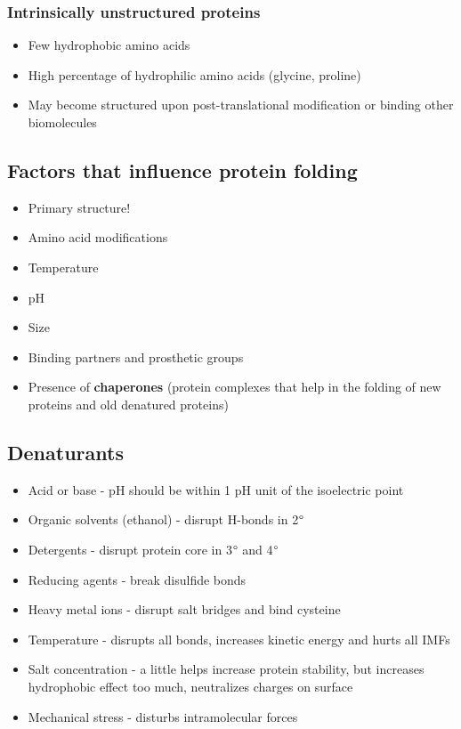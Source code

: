 \documentclass[letterpaper, 12pt]{article}
\begin{document}
\subsubsection*{Intrinsically unstructured proteins}

\begin{itemize}
\item Few hydrophobic amino acids
\item High percentage of hydrophilic amino acids (glycine, proline)
\item May become structured upon post-translational modification or binding other biomolecules
\end{itemize}

\subsection*{Factors that influence protein folding}

\begin{itemize}
\item Primary structure!
\item Amino acid modifications
\item Temperature
\item pH
\item Size
\item Binding partners and prosthetic groups
\item Presence of \textbf{chaperones} (protein complexes that help in the folding of new proteins and old denatured proteins)
\end{itemize}

\subsection*{Denaturants}

\begin{itemize}
\item Acid or base - pH should be within 1 pH unit of the isoelectric point
\item Organic solvents (ethanol) - disrupt H-bonds in 2$\degree$
\item Detergents - disrupt protein core in 3$\degree$ and 4$\degree$
\item Reducing agents - break disulfide bonds
\item Heavy metal ions - disrupt salt bridges and bind cysteine
\item Temperature - disrupts all bonds, increases kinetic energy and hurts all IMFs
\item Salt concentration - a little helps increase protein stability, but increases hydrophobic effect too much, neutralizes charges on surface
\item Mechanical stress - disturbs intramolecular forces
\end{itemize}
\end{document}

